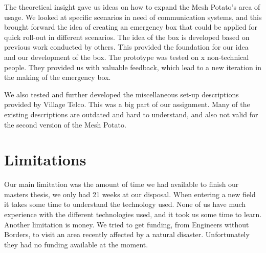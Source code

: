 The theoretical insight gave us ideas on how to expand the Mesh Potato's area of usage. We looked at specific scenarios in need of communication systems, and this brought forward the idea of creating an emergency box that could be applied for quick roll-out in different scenarios. The idea of the box is developed based on previous work conducted by others. This provided the foundation for our idea and our development of the box. The prototype was tested on x non-technical people. They provided us with valuable feedback, which lead to a new iteration in the making of the emergency box. 

We also tested and further developed the miscellaneous set-up descriptions provided by Village Telco. This was a big part of our assignment. Many of the existing descriptions are outdated and hard to understand, and also not valid for the second version of the Mesh Potato.



\section{Limitations}
Our main limitation was the amount of time we had available to finish our masters thesis, we only had 21 weeks at our disposal. When entering a new field it takes some time to understand the technology used. None of us have much experience with the different technologies used, and it took us some time to learn. Another limitation is money. We tried to get funding, from Engineers without Borders, to visit an area recently affected by a natural disaster. Unfortunately they had no funding available at the moment.


